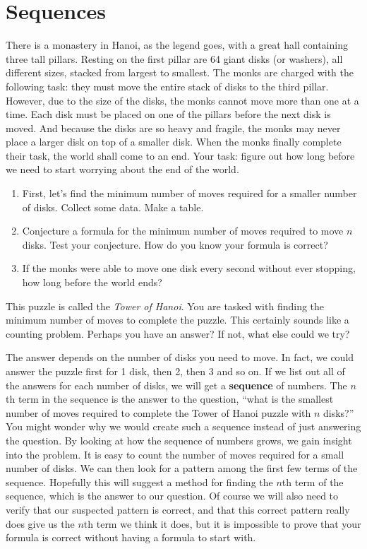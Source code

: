 \documentclass[11pt,]{book}
\newcommand{\terminology}[1]{\textbf{#1}}
\theoremstyle{ptxplainnotitle}
\theoremstyle{ptxplaintitle}
\theoremstyle{ptxdefinitionnotitle}
\theoremstyle{ptxdefinitiontitle}
\theoremstyle{ptxdefinitionnotitle}
\theoremstyle{ptxdefinitiontitle}
\theoremstyle{ptxdefinitionnotitle}
\theoremstyle{ptxdefinitiontitle}
\theoremstyle{ptxdefinitiontitlenonumber}
\theoremstyle{ptxdefinitiontitlenonumber}
\numberwithin{equation}{chapter}
\begin{document}
\chapter[{Sequences}]{Sequences}\label{ch_sequences}
\begin{investigation}\label{investigation-1}
\hypertarget{p-16}{}%
There is a monastery in Hanoi, as the legend goes, with a great hall containing three tall pillars. Resting on the first pillar are 64 giant disks (or washers), all different sizes, stacked from largest to smallest. The monks are charged with the following task: they must move the entire stack of disks to the third pillar. However, due to the size of the disks, the monks cannot move more than one at a time. Each disk must be placed on one of the pillars before the next disk is moved. And because the disks are so heavy and fragile, the monks may never place a larger disk on top of a smaller disk. When the monks finally complete their task, the world shall come to an end. Your task: figure out how long before we need to start worrying about the end of the world. %
\begin{enumerate}
\item\hypertarget{li-1}{}\hypertarget{p-17}{}%
First, let's find the minimum number of moves required for a smaller number of disks. Collect some data. Make a table.%
\item\hypertarget{li-2}{}\hypertarget{p-18}{}%
Conjecture a formula for the minimum number of moves required to move \(n\) disks. Test your conjecture. How do you know your formula is correct?%
\item\hypertarget{li-3}{}\hypertarget{p-19}{}%
If the monks were able to move one disk every second without ever stopping, how long before the world ends?%
\end{enumerate}
%
\end{investigation}
\hypertarget{p-20}{}%
This puzzle is called the \emph{Tower of Hanoi}. You are tasked with finding the minimum number of moves to complete the puzzle. This certainly sounds like a counting problem. Perhaps you have an answer? If not, what else could we try?%
\par
\hypertarget{p-21}{}%
The answer depends on the number of disks you need to move. In fact, we could answer the puzzle first for 1 disk, then 2, then 3 and so on. If we list out all of the answers for each number of disks, we will get a \terminology{sequence} of numbers. The \(n\)th term in the sequence is the answer to the question, ``what is the smallest number of moves required to complete the Tower of Hanoi puzzle with \(n\) disks?'' You might wonder why we would create such a sequence instead of just answering the question. By looking at how the sequence of numbers grows, we gain insight into the problem. It is easy to count the number of moves required for a small number of disks. We can then look for a pattern among the first few terms of the sequence. Hopefully this will suggest a method for finding the \(n\)th term of the sequence, which is the answer to our question. Of course we will also need to verify that our suspected pattern is correct, and that this correct pattern really does give us the \(n\)th term we think it does, but it is impossible to prove that your formula is correct without having a formula to start with.%
\end{document}
